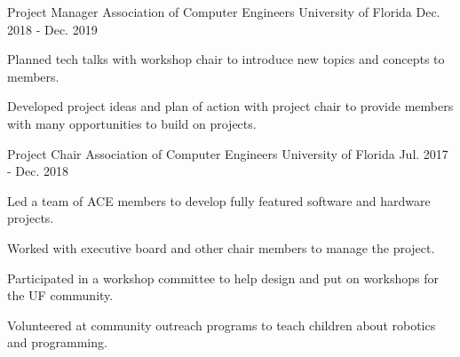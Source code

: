 


\begin{cventries}

\cventry
{Project Manager} %
{Association of Computer Engineers} %
{University of Florida} %
{Dec. 2018 - Dec. 2019} %
{ %
	\begin{cvitems}
		\setlength{\itemindent}{.125in}
		\item {Planned tech talks with workshop chair to introduce new topics and concepts to members.}
		\item {Developed project ideas and plan of action with project chair to provide members with many opportunities to build on projects.}
	\end{cvitems}
}



\cventry
{Project Chair} %
{Association of Computer Engineers} %
{University of Florida} %
{Jul. 2017 - Dec. 2018} %
{ %
\begin{cvitems}
\setlength{\itemindent}{.125in}
\item {Led a team of ACE members to develop fully featured software and hardware projects.}
\item {Worked with executive board and other chair members to manage the project.}
\item {Participated in a workshop committee to help design and put on workshops for the UF community. }
\item {Volunteered at community outreach programs to teach children about robotics and programming.}
\end{cvitems}
}


\end{cventries}
